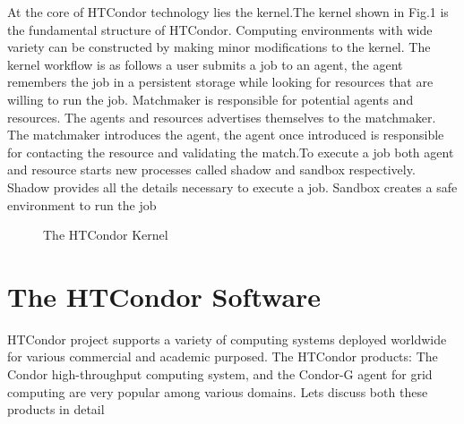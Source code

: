 \documentclass[9pt,twocolumn,twoside]{styles/osajnl}
\begin{document}
At the core of HTCondor technology lies the kernel.The kernel shown in
Fig.1 is the fundamental structure of HTCondor. Computing environments
with wide variety can be constructed by making minor modifications to
the kernel. The kernel workflow is as follows a user submits a job to
an agent, the agent remembers the job in a persistent storage while
looking for resources that are willing to run the job. Matchmaker is
responsible for potential agents and resources. The agents and
resources advertises themselves to the matchmaker. The matchmaker
introduces the agent, the agent once introduced is responsible for
contacting the resource and validating the match.To execute a job both
agent and resource starts new processes called shadow and sandbox
respectively. Shadow provides all the details necessary to execute a
job. Sandbox creates a safe environment to run the job
\cite{condor-practice}




\begin{figure}[htbp]
\centering
{}
\caption{The HTCondor Kernel}
\label{fig:condor-practice}
\end{figure}

\section{The HTCondor Software}
HTCondor project supports a variety of computing systems deployed
worldwide for various commercial and academic purposed. The HTCondor
products: The Condor high-throughput computing system, and the
Condor-G agent for grid computing are very popular among various
domains. Lets discuss both these products in detail
\end{document}
